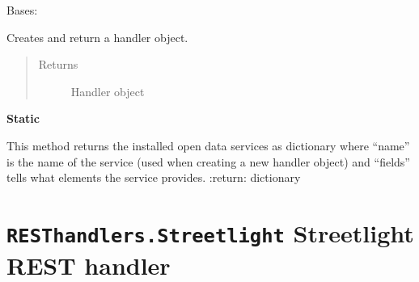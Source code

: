 \documentclass[letterpaper,10pt,english]{sphinxmanual}
\begin{document}
\begin{fulllineitems}
\label{handler/factory:RESThandlers.HandlerInterface.Factory.HandlerFactory}
Bases: 

\begin{fulllineitems}
\label{handler/factory:RESThandlers.HandlerInterface.Factory.HandlerFactory.create}
Creates and return a handler object.
\begin{quote}\begin{description}
\item[{Returns}] \leavevmode
Handler object

\end{description}\end{quote}

\end{fulllineitems}


\begin{fulllineitems}
\label{handler/factory:RESThandlers.HandlerInterface.Factory.HandlerFactory.get_installed}
\textbf{Static}

This method returns the installed open data services as dictionary where ``name'' is the name of the service (used
when creating a new handler object) and ``fields'' tells what elements the service provides.
:return: dictionary

\end{fulllineitems}


\end{fulllineitems}



\section{\texttt{RESThandlers.Streetlight} Streetlight REST handler}
\label{handler/handlers:module-RESThandlers.Streetlight.Handler}\label{handler/handlers::doc}\label{handler/handlers:resthandlers-streetlight-streetlight-rest-handler}\label{handler/handlers:module-Handlers.Streetlight.handler}
\end{document}
